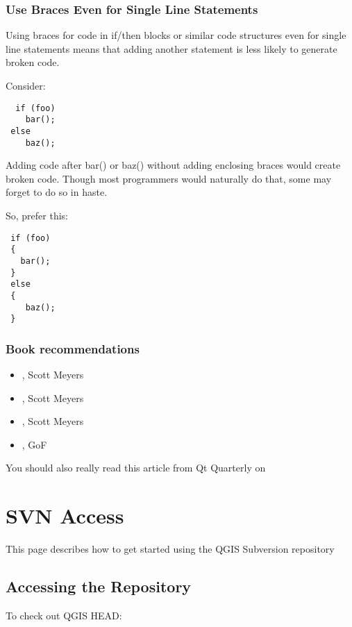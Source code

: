 \subsubsection{Use Braces Even for Single Line Statements}
Using braces for code in if/then blocks or similar code structures even for
single line statements means that adding another statement is less likely to
generate broken code.

Consider:

\begin{verbatim}
  if (foo)
    bar();
 else
    baz();
\end{verbatim}

Adding code after bar() or baz() without adding enclosing braces would create
broken code.  Though most programmers would naturally do that, some may forget
to do so in haste.

So, prefer this:

\begin{verbatim}
 if (foo)
 {
   bar();
 }
 else
 { 
    baz();
 } 
\end{verbatim}

\subsubsection{Book recommendations}
\begin{itemize}
\item {}, Scott Meyers
\item {}, Scott Meyers
\item {}, Scott Meyers
\item {}, GoF
\end{itemize}

You should also really read this article from Qt Quarterly on 

\section{SVN Access}
This page describes how to get started using the QGIS Subversion repository

\subsection{Accessing the Repository}
To check out QGIS HEAD:

